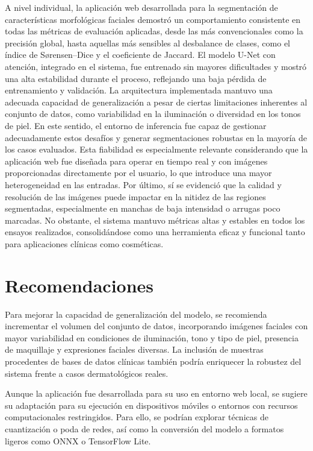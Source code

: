 A nivel individual, la aplicación web desarrollada para la segmentación de características morfológicas faciales demostró un comportamiento consistente en todas las métricas de evaluación aplicadas, desde las más convencionales como la precisión global, hasta aquellas más sensibles al desbalance de clases, como el índice de Sørensen–Dice y el coeficiente de Jaccard. El modelo U-Net con atención, integrado en el sistema, fue entrenado sin mayores dificultades y mostró una alta estabilidad durante el proceso, reflejando una baja pérdida de entrenamiento y validación. La arquitectura implementada mantuvo una adecuada capacidad de generalización a pesar de ciertas limitaciones inherentes al conjunto de datos, como variabilidad en la iluminación o diversidad en los tonos de piel. En este sentido, el entorno de inferencia fue capaz de gestionar adecuadamente estos desafíos y generar segmentaciones robustas en la mayoría de los casos evaluados. Esta fiabilidad es especialmente relevante considerando que la aplicación web fue diseñada para operar en tiempo real y con imágenes proporcionadas directamente por el usuario, lo que introduce una mayor heterogeneidad en las entradas. Por último, sí se evidenció que la calidad y resolución de las imágenes puede impactar en la nitidez de las regiones segmentadas, especialmente en manchas de baja intensidad o arrugas poco marcadas. No obstante, el sistema mantuvo métricas altas y estables en todos los ensayos realizados, consolidándose como una herramienta eficaz y funcional tanto para aplicaciones clínicas como cosméticas.

\section{Recomendaciones}

Para mejorar la capacidad de generalización del modelo, se recomienda incrementar el volumen del conjunto de datos, incorporando imágenes faciales con mayor variabilidad en condiciones de iluminación, tono y tipo de piel, presencia de maquillaje y expresiones faciales diversas. La inclusión de muestras procedentes de bases de datos clínicas también podría enriquecer la robustez del sistema frente a casos dermatológicos reales.

Aunque la aplicación fue desarrollada para su uso en entorno web local, se sugiere su adaptación para su ejecución en dispositivos móviles o entornos con recursos computacionales restringidos. Para ello, se podrían explorar técnicas de cuantización o poda de redes, así como la conversión del modelo a formatos ligeros como ONNX o TensorFlow Lite.

